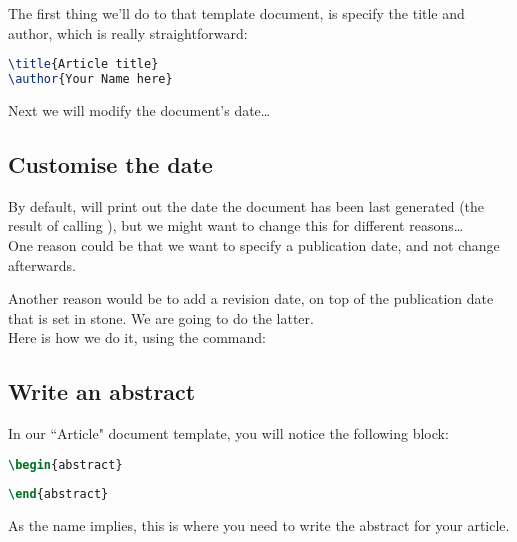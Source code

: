 The first thing we'll do to that template document, is specify the title and author, which is really straightforward:
\begin{lstlisting}[language=tex]
\title{Article title}
\author{Your Name here}
\end{lstlisting}


Next we will modify the document's date\dots 

\subsection{Customise the date}  \label{customise-date}

By default,  will print out the date the document has been last generated (the result of calling ), but we might want to change this for different reasons\dots \\

One reason could be that we want to specify a publication date, and not change afterwards.

Another reason would be to add a revision date, on top of the publication date that is set in stone. We are going to do the latter. \\

Here is how we do it, using the  command:





\newpage

\subsection{Write an abstract} \label{write-abstract}

In our ``Article" document template, you will notice the following block:

\begin{lstlisting}[language=tex]
\begin{abstract}
	
\end{abstract}
\end{lstlisting}


As the name implies, this is where you need to write the abstract for your article.  \\

\bigskip

